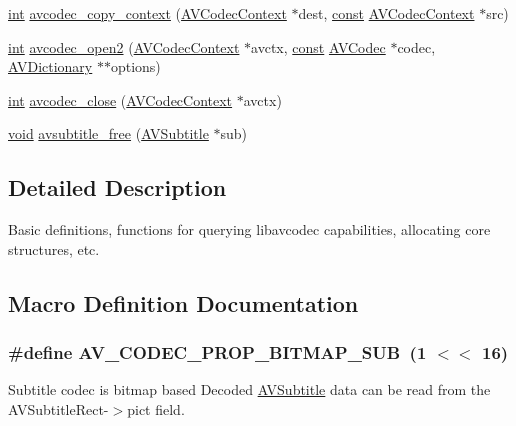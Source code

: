 \begin{DoxyCompactItemize}
\hyperlink{xmltok_8h_a5a0d4a5641ce434f1d23533f2b2e6653}{int} \hyperlink{group__lavc__core_ga3933b21b9dcb9173df3e56673b7a7d76}{avcodec\+\_\+copy\+\_\+context} (\hyperlink{struct_a_v_codec_context}{A\+V\+Codec\+Context} $\ast$dest, \hyperlink{getopt1_8c_a2c212835823e3c54a8ab6d95c652660e}{const} \hyperlink{struct_a_v_codec_context}{A\+V\+Codec\+Context} $\ast$src)
\item 
\hyperlink{xmltok_8h_a5a0d4a5641ce434f1d23533f2b2e6653}{int} \hyperlink{group__lavc__core_ga11f785a188d7d9df71621001465b0f1d}{avcodec\+\_\+open2} (\hyperlink{struct_a_v_codec_context}{A\+V\+Codec\+Context} $\ast$avctx, \hyperlink{getopt1_8c_a2c212835823e3c54a8ab6d95c652660e}{const} \hyperlink{struct_a_v_codec}{A\+V\+Codec} $\ast$codec, \hyperlink{group__lavu__dict_ga1d7cc0833bee918994a600556410315f}{A\+V\+Dictionary} $\ast$$\ast$options)
\item 
\hyperlink{xmltok_8h_a5a0d4a5641ce434f1d23533f2b2e6653}{int} \hyperlink{group__lavc__core_gaf4daa92361efb3523ef5afeb0b54077f}{avcodec\+\_\+close} (\hyperlink{struct_a_v_codec_context}{A\+V\+Codec\+Context} $\ast$avctx)
\item 
\hyperlink{sound_8c_ae35f5844602719cf66324f4de2a658b3}{void} \hyperlink{group__lavc__core_gaa2c3e02a761d9fc0c5c9b2340408c332}{avsubtitle\+\_\+free} (\hyperlink{struct_a_v_subtitle}{A\+V\+Subtitle} $\ast$sub)
\end{DoxyCompactItemize}


\subsection{Detailed Description}
Basic definitions, functions for querying libavcodec capabilities, allocating core structures, etc. 

\subsection{Macro Definition Documentation}
\subsubsection[{\texorpdfstring{A\+V\+\_\+\+C\+O\+D\+E\+C\+\_\+\+P\+R\+O\+P\+\_\+\+B\+I\+T\+M\+A\+P\+\_\+\+S\+UB}{AV_CODEC_PROP_BITMAP_SUB}}]{\setlength{\rightskip}{0pt plus 5cm}\#define A\+V\+\_\+\+C\+O\+D\+E\+C\+\_\+\+P\+R\+O\+P\+\_\+\+B\+I\+T\+M\+A\+P\+\_\+\+S\+UB~(1 $<$$<$ 16)}\hypertarget{group__lavc__core_gac0dfb59ee63132c9a064696a741419f6}{}\label{group__lavc__core_gac0dfb59ee63132c9a064696a741419f6}
Subtitle codec is bitmap based Decoded \hyperlink{struct_a_v_subtitle}{A\+V\+Subtitle} data can be read from the A\+V\+Subtitle\+Rect-\/$>$pict field. 

